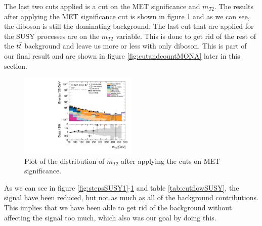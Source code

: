 The last two cuts applied is a cut on the MET significance and $m_{T2}$. The results after applying the MET significance cut is shown in figure \ref{fig:stepsSUSY3} and as we can see, the diboson is still the dominating background. The last cut that are applied for the SUSY processes are on the $m_{T2}$ variable. This is done to get rid of the rest of the $t\Bar{t}$ background and leave us more or less with only diboson. This is part of our final result and are shown in figure \ref{fig:cutandcountMONA} later in this section.

\begin{figure}[H]
    \centering
        \includegraphics[width=0.5\textwidth]{Figures/SUSYcuts/hist1d_mt2_SUSY.pdf}
    \caption{Plot of the distribution of $m_{T2}$ after applying the cuts on MET significance.}
    \label{fig:stepsSUSY3}
\end{figure}

As we can see in figure \ref{fig:stepsSUSY1}-\ref{fig:stepsSUSY3} and table \ref{tab:cutflowSUSY}, the signal have been reduced, but not as much as all of the background contributions. This implies that we have been able to get rid of the background without affecting the signal too much, which also was our goal by doing this. 

